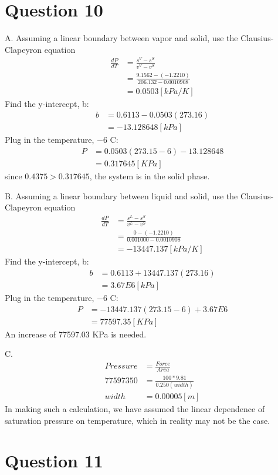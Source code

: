 \documentclass{article}
\numberwithin{equation}{section}
\begin{document}
\section*{Question 10}

A. Assuming a linear boundary between vapor and solid, use the Clausius-Clapeyron equation
\begin{align*}
\frac{dP}{dT}&=\frac{s^V-s^S}{v^V-v^S}\\
&=\frac{9.1562-(-1.2210)}{206.132-0.0010908}\\
&=0.0503 [kPa/K]
\end{align*}
Find the y-intercept, b:
\begin{align*}
b&=0.6113-0.0503(273.16)\\
&=-13.128648 [kPa]
\end{align*}
Plug in the temperature, $-6$ C:
\begin{align*}
P&=0.0503(273.15-6)-13.128648\\
&=0.317645 [KPa]
\end{align*}
since $0.4375>0.317645$, the system is in the solid phase.

B. Assuming a linear boundary between liquid and solid, use the Clausius-Clapeyron equation
\begin{align*}
\frac{dP}{dT}&=\frac{s^L-s^S}{v^L-v^S}\\
&=\frac{0-(-1.2210)}{0.001000-0.0010908}\\
&=-13447.137 [kPa/K]
\end{align*}
Find the y-intercept, b:
\begin{align*}
b&=0.6113+13447.137(273.16)\\
&=3.67E6 [kPa]
\end{align*}
Plug in the temperature, $-6$ C:
\begin{align*}
P&=-13447.137(273.15-6)+3.67E6\\
&=77597.35 [KPa]
\end{align*}
An increase of 77597.03 KPa is needed.

C. 
\begin{align*}
Pressure&=\frac{Force}{Area}\\
77597350&=\frac{100*9.81}{0.250(width)}\\
width&=0.00005 [m]
\end{align*}
In making such a calculation, we have assumed the linear dependence of saturation pressure on temperature, which in reality may not be the case.

\section*{Question 11}
\end{document}
